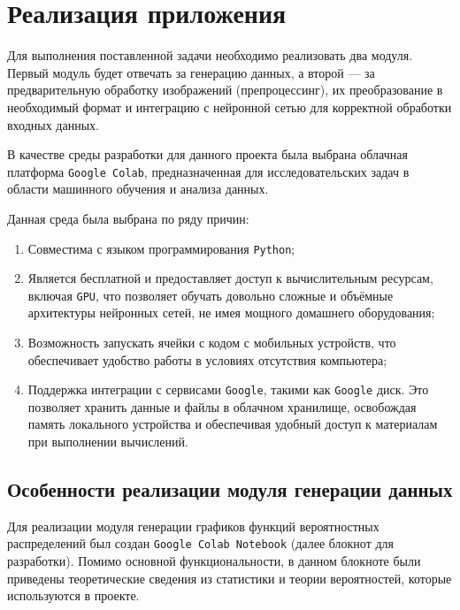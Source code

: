 \documentclass[14pt, russian]{scrartcl}
\begin{document}
\section{Реализация приложения}

Для выполнения поставленной задачи необходимо реализовать два модуля. Первый модуль будет отвечать за генерацию данных, а второй — за предварительную обработку изображений (препроцессинг), их преобразование в необходимый формат и интеграцию с нейронной сетью для корректной обработки входных данных.

В качестве среды разработки для данного проекта была выбрана облачная платформа \verb|Google Colab|\cite{colab}, предназначенная для исследовательских задач в области машинного обучения и анализа данных.

Данная среда была выбрана по ряду причин: 
\begin{enumerate}
    \item Совместима с языком программирования \verb|Python|;
    \item Является бесплатной и предоставляет доступ к вычислительным ресурсам, включая \verb|GPU|, что позволяет обучать довольно сложные и объёмные архитектуры нейронных сетей, не имея мощного домашнего оборудования;
    \item Возможность запускать ячейки с кодом с мобильных устройств, что обеспечивает удобство работы в условиях отсутствия компьютера;
    \item Поддержка интеграции с сервисами \verb|Google|, такими как \verb|Google| диск. Это позволяет хранить данные и файлы в облачном хранилище, освобождая память локального устройства и обеспечивая удобный доступ к материалам при выполнении вычислений.
\end{enumerate}


\subsection{Особенности реализации модуля генерации данных}
Для реализации модуля генерации графиков функций вероятностных распределений был создан \verb|Google Colab Notebook| (далее блокнот для разработки). Помимо основной функциональности, в данном блокноте были приведены теоретические сведения из статистики и теории вероятностей, которые используются в проекте.
\end{document}
